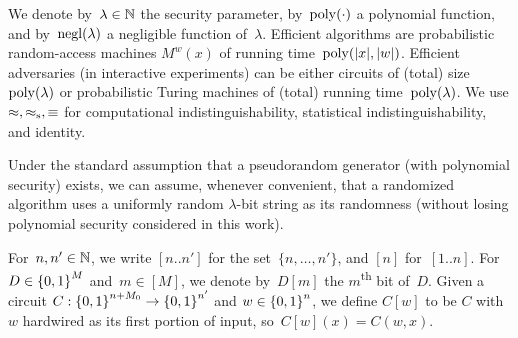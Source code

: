 We denote by~${\lambda\in{\mathbb{N}}}$ the security parameter,
by~$\operatorname{poly}({\cdot})$ a polynomial function, and
by~$\operatorname{negl}(\lambda)$ a negligible function of~$\lambda$.
Efficient algorithms are probabilistic random-access machines $M^w(x)$ of running time~$\operatorname{poly}(|x|,|w|)$.
Efficient adversaries (in interactive experiments) can be either circuits of (total) size~$\operatorname{poly}(\lambda)$ or probabilistic Turing machines of (total) running time~$\operatorname{poly}(\lambda)$.
We use $\approx,\approx_{\textup{s}},\equiv$ for computational indistinguishability, statistical indistinguishability, and identity.

Under the standard assumption that a pseudorandom generator (with polynomial security) exists,
we can assume, whenever convenient, that a randomized algorithm uses a uniformly random $\lambda$-bit string as its randomness (without losing polynomial security considered in this work).

For~${n,n'\in{\mathbb{N}}}$, we write $[n..n']$ for the set~$\{n,\dots,n'\}$,
and $[n]$ for~$[1..n]$.
For~${D\in{\{0,1\}}^M}$ and~${m\in[M]}$, we denote by~$D[m]$ the $m$\textsuperscript{th} bit of~$D$.
Given a circuit ${C:{\{0,1\}}^{n+M_0}\to{\{0,1\}}^{n'}}$ and ${w\in{\{0,1\}}^n}$, we define $C[w]$ to be $C$ with $w$ hardwired as its first portion of input,
so~${C[w](x)=C(w,x)}$.
